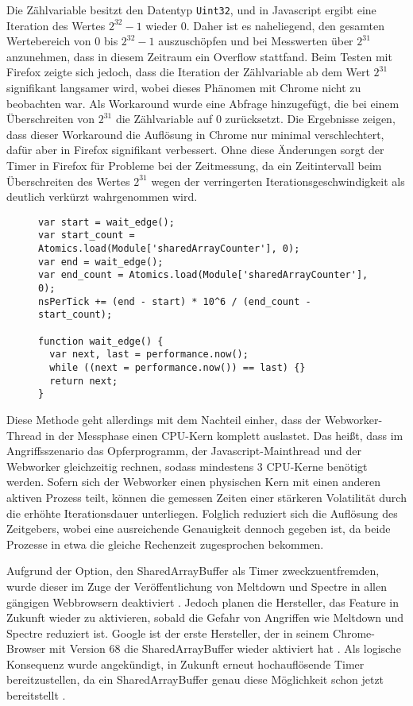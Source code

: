 Die Zählvariable besitzt den Datentyp \lstinline{Uint32}, und in Javascript ergibt eine Iteration des Wertes $2^{32}-1$ wieder 0. 
Daher ist es naheliegend, den gesamten Wertebereich von 0 bis $2^{32}-1$ auszuschöpfen und bei Messwerten über $2^{31}$ anzunehmen, dass in diesem Zeitraum ein Overflow stattfand.
Beim Testen mit Firefox zeigte sich jedoch, dass die Iteration der Zählvariable ab dem Wert $2^{31}$ signifikant langsamer wird, wobei dieses Phänomen mit Chrome nicht zu beobachten war.
Als Workaround wurde eine Abfrage hinzugefügt, die bei einem Überschreiten von $2^{31}$ die Zählvariable auf 0 zurücksetzt.
Die Ergebnisse zeigen, dass dieser Workaround die Auflösung in Chrome nur minimal verschlechtert, dafür aber in Firefox signifikant verbessert.
Ohne diese Änderungen sorgt der Timer in Firefox für Probleme bei der Zeitmessung, da ein Zeitintervall beim Überschreiten des Wertes $2^{31}$ wegen der verringerten Iterationsgeschwindigkeit als deutlich verkürzt wahrgenommen wird.

\begin{figure}[h]
\begin{lstlisting}[caption=main.js: Code zur Bestimmung der Timerauflösung,label=alg_list:getResolutionNS]
var start = wait_edge();
var start_count = Atomics.load(Module['sharedArrayCounter'], 0);
var end = wait_edge();
var end_count = Atomics.load(Module['sharedArrayCounter'], 0);
nsPerTick += (end - start) * 10^6 / (end_count - start_count);

function wait_edge() {
  var next, last = performance.now();
  while ((next = performance.now()) == last) {}
  return next;
}
\end{lstlisting}
\end{figure}

Diese Methode geht allerdings mit dem Nachteil einher, dass der Webworker-Thread in der Messphase einen CPU-Kern komplett auslastet. Das heißt, dass im Angriffsszenario das Opferprogramm, der Javascript-Mainthread und der Webworker gleichzeitig rechnen, sodass mindestens 3 CPU-Kerne benötigt werden. 
Sofern sich der Webworker einen physischen Kern mit einen anderen aktiven Prozess teilt, können die gemessen Zeiten einer stärkeren Volatilität durch die erhöhte Iterationsdauer unterliegen.
Folglich reduziert sich die Auflösung des Zeitgebers, wobei eine ausreichende Genauigkeit dennoch gegeben ist, da beide Prozesse in etwa die gleiche Rechenzeit zugesprochen bekommen.

Aufgrund der Option, den SharedArrayBuffer als Timer zweckzuentfremden, wurde dieser im Zuge der Veröffentlichung von Meltdown und Spectre in allen gängigen Webbrowsern deaktiviert \cite{FirefoxSharedArrayBuffer}. Jedoch planen die Hersteller, das Feature in Zukunft wieder zu aktivieren, sobald die Gefahr von Angriffen wie Meltdown und Spectre reduziert ist. 
Google ist der erste Hersteller, der in seinem Chrome-Browser mit Version 68 die SharedArrayBuffer wieder aktiviert hat \cite{ChromeSharedArrayBufferAgain}. 
Als logische Konsequenz wurde angekündigt, in Zukunft erneut hochauflösende Timer bereitzustellen, da ein SharedArrayBuffer genau diese Möglichkeit schon jetzt bereitstellt \cite{ChromeHighResolutionTimerAgain}.

